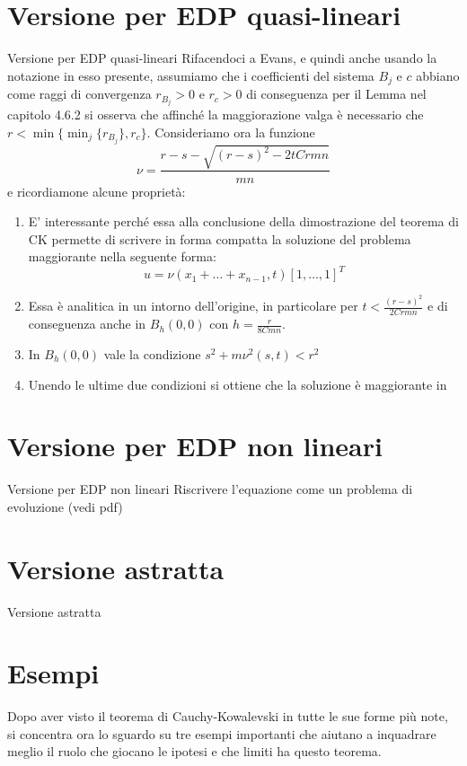 \section{Versione per EDP quasi-lineari}
Versione per EDP quasi-lineari
Rifacendoci a Evans, e quindi anche usando la notazione in esso presente, 
assumiamo che i coefficienti del sistema $B_j$ e $c$ abbiano come raggi di convergenza $r_{B_j}>0$ e $r_c>0$ 
di conseguenza per il Lemma nel capitolo 4.6.2 si osserva che affinché la maggiorazione valga è necessario 
che $r<\min\{\min_{j} \{r_{B_j}\}, r_c \}$.
Consideriamo ora la funzione $$\nu=\frac{r-s-\sqrt{(r-s)^2-2tCrmn}}{mn}$$ e ricordiamone alcune proprietà:
\begin{enumerate}[1.]

\item
E' interessante perché essa alla conclusione della dimostrazione del teorema di CK 
permette di scrivere in forma compatta la soluzione del problema maggiorante nella seguente forma: 
$$u = \nu(x_1+\ldots+x_{n-1}, t)[1,\ldots,1]^T$$

\item
Essa è analitica in un intorno dell'origine, in particolare per $t<\frac{(r-s)^2}{2Crmn}$ e di 
conseguenza anche in $B_h(0,0)$ con $h=\frac{r}{8Cmn}$.

\item
In $B_h(0,0)$ vale la condizione $s^2+m\nu ^2 (s,t)< r^2$

\item
Unendo le ultime due condizioni si ottiene che la soluzione è maggiorante in 

\end{enumerate}

\section{Versione per EDP non lineari}
Versione per EDP non lineari
Riscrivere l'equazione come un problema di evoluzione (vedi pdf)
\section{Versione astratta}
Versione astratta

\section{Esempi}
Dopo aver visto il teorema di Cauchy-Kowalevski in tutte le sue forme più note, si concentra ora lo sguardo su tre esempi importanti  che aiutano a inquadrare meglio il ruolo che giocano le ipotesi e che limiti ha questo teorema.

